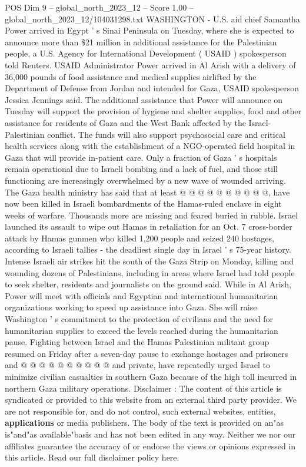 \begin{textsample}{POS Dim 9 – global\_north\_2023\_12 – Score 1.00 – global\_north\_2023\_12/104031298.txt}  \label{ex:f9_pos_372}
WASHINGTON - U.S. aid chief Samantha Power arrived in Egypt ' s Sinai Peninsula on Tuesday, where she is expected to announce more than \$21 million in additional assistance for the Palestinian people, a U.S.
Agency for International Development ( USAID ) spokesperson told Reuters.
USAID Administrator Power arrived in Al Arish with a delivery of 36,000 pounds of food assistance and medical supplies airlifted by the Department of Defense from Jordan and intended for Gaza, USAID spokesperson Jessica Jennings said.
The additional assistance that Power will announce on Tuesday will support the provision of hygiene and shelter supplies, food and other assistance for residents of Gaza and the West Bank affected by the Israel-Palestinian conflict.
The funds will also support psychosocial care and critical health services along with the establishment of a NGO-operated field hospital in Gaza that will provide in-patient care.
Only a fraction of Gaza ' s hospitals remain operational due to Israeli bombing and a lack of fuel, and those still functioning are increasingly overwhelmed by a new wave of wounded arriving.
The Gaza health ministry has said that at least @ @ @ @ @ @ @ @ @ @, have now been killed in Israeli bombardments of the Hamas-ruled enclave in eight weeks of warfare.
Thousands more are missing and feared buried in rubble.
Israel launched its assault to wipe out Hamas in retaliation for an Oct. 7 cross-border attack by Hamas gunmen who killed 1,200 people and seized 240 hostages, according to Israeli tallies - the deadliest single day in Israel ' s 75-year history.
Intense Israeli air strikes hit the south of the Gaza Strip on Monday, killing and wounding dozens of Palestinians, including in areas where Israel had told people to seek shelter, residents and journalists on the ground said.
While in Al Arish, Power will meet with officials and Egyptian and international humanitarian organizations working to speed up assistance into Gaza.
She will raise Washington ' s commitment to the protection of civilians and the need for humanitarian supplies to exceed the levels reached during the humanitarian pause.
Fighting between Israel and the Hamas Palestinian militant group resumed on Friday after a seven-day pause to exchange hostages and prisoners and @ @ @ @ @ @ @ @ @ @ and private, have repeatedly urged Israel to minimize civilian casualties in southern Gaza because of the high toll incurred in northern Gaza military operations.
Disclaimer : The content of this article is syndicated or provided to this website from an external third party provider.
We are not responsible for, and do not control, such external websites, entities, \textbf{applications} or media publishers.
The body of the text is provided on an"as is"and"as available"basis and has not been edited in any way.
Neither we nor our affiliates guarantee the accuracy of or endorse the views or opinions expressed in this article.
Read our full disclaimer policy here.

\end{textsample}

